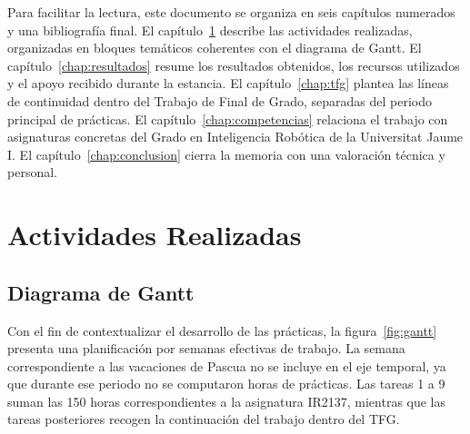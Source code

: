 \documentclass[11pt,fleqn,openany]{book} %
\begin{document}
Para facilitar la lectura, este documento se organiza en seis capítulos numerados y una bibliografía final. El capítulo~\ref{chap:actividades} describe las actividades realizadas, organizadas en bloques temáticos coherentes con el diagrama de Gantt. El capítulo~\ref{chap:resultados} resume los resultados obtenidos, los recursos utilizados y el apoyo recibido durante la estancia. El capítulo~\ref{chap:tfg} plantea las líneas de continuidad dentro del Trabajo de Final de Grado, separadas del periodo principal de prácticas. El capítulo~\ref{chap:competencias} relaciona el trabajo con asignaturas concretas del Grado en Inteligencia Robótica de la Universitat Jaume I. El capítulo~\ref{chap:conclusion} cierra la memoria con una valoración técnica y personal.


\chapter{Actividades Realizadas}\label{chap:actividades}

\section{Diagrama de Gantt}

Con el fin de contextualizar el desarrollo de las prácticas, la figura~\ref{fig:gantt} presenta una planificación por semanas efectivas de trabajo. La semana correspondiente a las vacaciones de Pascua no se incluye en el eje temporal, ya que durante ese periodo no se computaron horas de prácticas. Las tareas 1 a 9 suman las 150 horas correspondientes a la asignatura IR2137, mientras que las tareas posteriores recogen la continuación del trabajo dentro del TFG.

\end{document}
